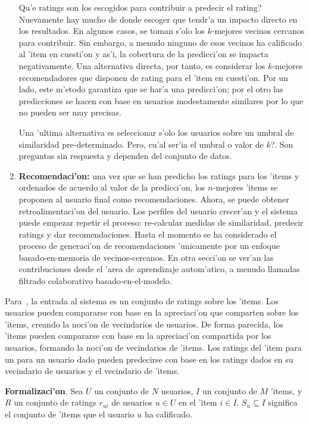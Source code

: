 \documentclass[11pt]{article}
\begin{document}
\begin{enumerate}
\smallskip
\textquestiondown Qu'e ratings son los escogidos para contribuir a predecir el rating? Nuevamente hay mucho de donde escoger que tendr'a un impacto directo en los resultados. En algunos casos, se toman s'olo los $k$-mejores vecinos cercanos para contribuir. Sin embargo, a menudo ninguno de esos vecinos ha calificado al 'item en cuesti'on y as'i, la cobertura de la predicci'on se impacta negativamente. Una alternativa directa, por tanto, es considerar los $k$-mejores recomendadores que disponen de rating para el 'item en cuesti'on. Por un lado, este m'etodo garantiza que se har'a una predicci'on; por el otro las predicciones se hacen con base en usuarios modestamente similares por lo que no pueden ser muy precisas.

\smallskip
Una 'ultima alternativa es seleccionar s'olo los usuarios sobre un umbral de similaridad pre-determinado. Pero, \textquestiondown cu'al ser'ia el umbral o valor de $k$?. Son preguntas sin respuesta y dependen del conjunto de datos.

\item \textbf{Recomendaci'on:} una vez que se han predicho los ratings para los 'items y ordenados de acuerdo al valor de la predicci'on, los $n$-mejores 'items se proponen al usuario final como recomendaciones. Ahora, se puede obtener retroalimentaci'on del usuario. Los perfiles del usuario crecer'an y el sistema puede empezar repetir el proceso: re-calcular medidas de similaridad, predecir ratings y dar recomendaciones. Hasta el momento se ha considerado el proceso de generaci'on de recomendaciones 'unicamente por un enfoque basado-en-memoria de vecinos-cercanos. En otra secci'on se ver'an las contribuciones desde el 'area de aprendizaje autom'atico, a menudo llamadas filtrado colaborativo basado-en-el-modelo.
\end{enumerate}

Para~\cite{start:candillier09}, la entrada al sistema es un conjunto de ratings sobre los 'items. Los usuarios pueden compararse con base en la apreciaci'on que comparten sobre los 'items, creando la noci'on de vecindarios de usuarios. De forma parecida, los 'items pueden compararse con base en la apreciaci'on compartida por los usuarios, formando la noci'on de vecindarios de 'items. Los ratings del 'item para un para un usuario dado pueden predecirse con base en los ratings dados en su vecindario de usuarios y el vecindario de 'items.

\smallskip
\textbf{Formalizaci'on}. Sea $U$ un conjunto de $N$ usuarios, $I$ un conjunto de $M$ 'items, y $R$ un conjunto de ratings $r_{ui}$ de usuarios $u \in U$ en el 'item $i \in I$. $S_u \subseteq I$ significa el conjunto de 'items que el usuario $u$ ha calificado.
\end{document}
